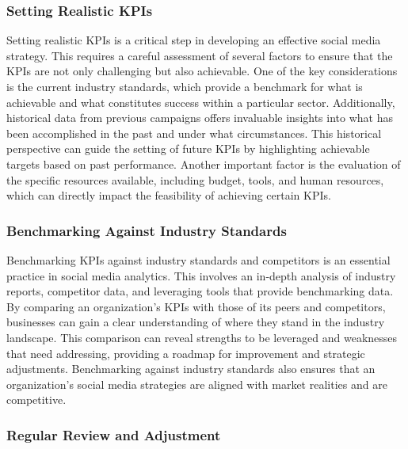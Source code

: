 \documentclass[
]{book}
\begin{document}
\hypertarget{setting-realistic-kpis}{%
\subsubsection*{Setting Realistic KPIs}\label{setting-realistic-kpis}}

Setting realistic KPIs is a critical step in developing an effective social media strategy. This requires a careful assessment of several factors to ensure that the KPIs are not only challenging but also achievable. One of the key considerations is the current industry standards, which provide a benchmark for what is achievable and what constitutes success within a particular sector. Additionally, historical data from previous campaigns offers invaluable insights into what has been accomplished in the past and under what circumstances. This historical perspective can guide the setting of future KPIs by highlighting achievable targets based on past performance. Another important factor is the evaluation of the specific resources available, including budget, tools, and human resources, which can directly impact the feasibility of achieving certain KPIs.

\hypertarget{benchmarking-against-industry-standards}{%
\subsubsection*{Benchmarking Against Industry Standards}\label{benchmarking-against-industry-standards}}

Benchmarking KPIs against industry standards and competitors is an essential practice in social media analytics. This involves an in-depth analysis of industry reports, competitor data, and leveraging tools that provide benchmarking data. By comparing an organization's KPIs with those of its peers and competitors, businesses can gain a clear understanding of where they stand in the industry landscape. This comparison can reveal strengths to be leveraged and weaknesses that need addressing, providing a roadmap for improvement and strategic adjustments. Benchmarking against industry standards also ensures that an organization's social media strategies are aligned with market realities and are competitive.

\hypertarget{regular-review-and-adjustment}{%
\subsubsection*{Regular Review and Adjustment}\label{regular-review-and-adjustment}}
\end{document}
